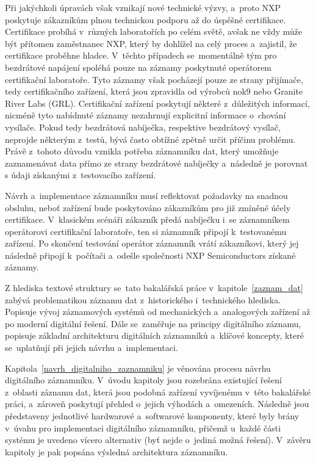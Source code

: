 Při jakýchkoli úpravách však vznikají nové technické výzvy, a~proto NXP poskytuje zákazníkům plnou technickou podporu až do úspěšné certifikace. Certifikace probíhá v~různých laboratořích po celém světě, avšak ne vždy může být přítomen zaměstnanec NXP, který by dohlížel na celý proces a~zajistil, že certifikace proběhne hladce. V~těchto případech se~momentálně tým pro bezdrátové napájení spoléhá pouze na záznamy poskytnuté operátorem certifikační laboratoře. Tyto záznamy však pocházejí pouze ze strany přijímače, tedy certifikačního zařízení, která jsou zpravidla od výrobců nok9 nebo Granite River Labs (GRL). Certifikační zařízení poskytují některé z~důležitých informací, nicméně tyto nabídnuté záznamy nezahrnují explicitní informace o~chování vysílače. Pokud tedy bezdrátová nabíječka, respektive bezdrátový vysílač, neprojde některým z~testů, bývá často obtížné zpětně určit příčinu problému. Právě z~tohoto důvodu vznikla potřeba záznamníku dat, který umožňuje zaznamenávat data přímo ze strany bezdrátové nabíječky a~následně je porovnat s údaji získanými z~testovacího zařízení.~\cite{nxp_wireless_charging_team}

Návrh a~implementace záznamníku musí reflektovat požadavky na snadnou obsluhu, neboť zařízení bude poskytováno zákazníkům pro již zmíněné účely certifikace. V~klasickém scénáři zákazník předá nabíječku i~se záznamníkem operátorovi certifikační laboratoře, ten si záznamník připojí k~testovanému zařízení. Po skončení testování operátor záznamník vrátí zákazníkovi, který jej následně připojí k~počítači a~odešle společnosti NXP Semiconductors získané záznamy.

Z hlediska textové struktury se~tato bakalářská práce v~kapitole~\ref{zaznam_dat} zabývá problematikou záznamu dat z~historického i~technického hlediska. Popisuje vývoj záznamových systémů od mechanických a~analogových zařízení až po moderní digitální řešení. Dále se~zaměřuje na principy digitálního záznamu, popisuje základní architekturu digitálních záznamníků a~klíčové koncepty, které se~uplatňují při jejich návrhu a~implementaci.

Kapitola~\ref{navrh_digitalniho_zaznamniku} je věnována procesu návrhu digitálního záznamníku. V~úvodu kapitoly jsou rozebrána existující řešení z~oblasti záznamu dat, která jsou podobná zařízení vyvíjenému v~této bakalářské práci, a~zároveň poskytují přehled o~jejich výhodách a~omezeních. Následně jsou představeny jednotlivé hardwarové a~softwarové komponenty, které byly brány v~úvahu pro implementaci digitálního záznamníku, přičemž u~každé části systému je uvedeno vícero alternativ (byť nejde o~jediná možná řešení). V~závěru kapitoly je pak popsána výsledná architektura záznamníku.

